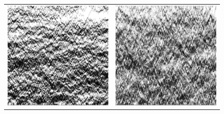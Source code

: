 \begin{figure}[h!]
\begin{center}
\begin{tabular}{c | c}
    \includegraphics[width=0.49\linewidth]{../tex-src/images/newFlowImps/midLongTime} &\includegraphics[width=0.49\linewidth]{../tex-src/images/newFlowImps/longTime}
    \end{tabular}
\end{center}
    \vspace{-2em}
\end{figure}

